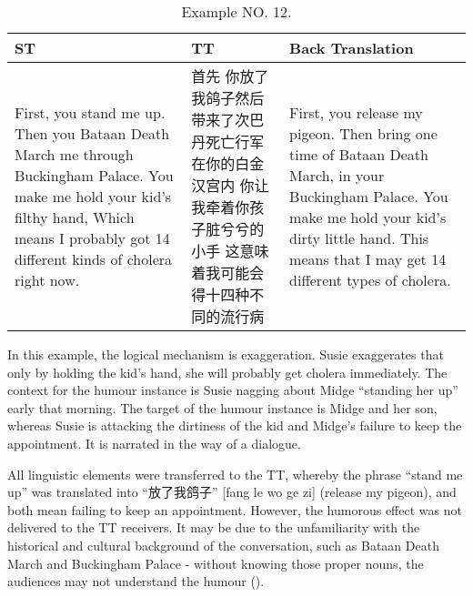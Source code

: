 \documentclass[english]{textolivre}
\begin{document}
\begin{table}[htpb]
\caption{Example NO. 12.}
\label{tbl12}
\begin{tabularx}{\linewidth}{XXX}
\toprule 
ST  & TT & Back Translation \\ 
\midrule
First, you stand me up. 
Then you Bataan Death March me through Buckingham 
Palace. 
You make me hold your kid's 
filthy hand,  
Which means I probably got 14 different kinds of cholera right now.  & 首先 你放了我鸽子然后带来了次巴丹死亡行军 
在你的白金汉宫内 
你让我牵着你孩子脏兮兮的小手 
这意味着我可能会得十四种不同的流行病   & First, you release my pigeon. 
Then bring one time of Bataan Death March, in your 
Buckingham Palace. 
You make me hold your kid's dirty little hand.  
This means that I may get 14 different types of cholera. \\ 
\bottomrule
\end{tabularx}
\end{table}

In this example, the logical mechanism is exaggeration. Susie exaggerates that only by holding the kid's hand, she will probably get cholera immediately. The context for the humour instance is Susie nagging about Midge “standing her up” early that morning. The target of the humour instance is Midge and her son, whereas Susie is attacking the dirtiness of the kid and Midge's failure to keep the appointment. It is narrated in the way of a dialogue. 

All linguistic elements were transferred to the TT, whereby the phrase “stand me up” was translated into “放了我鸽子” [fang le wo ge zi] (release my pigeon), and both mean failing to keep an appointment. However, the humorous effect was not delivered to the TT receivers. It may be due to the unfamiliarity with the historical and cultural background of the conversation, such as Bataan Death March and Buckingham Palace - without knowing those proper nouns, the audiences may not understand the humour ().
\end{document}
